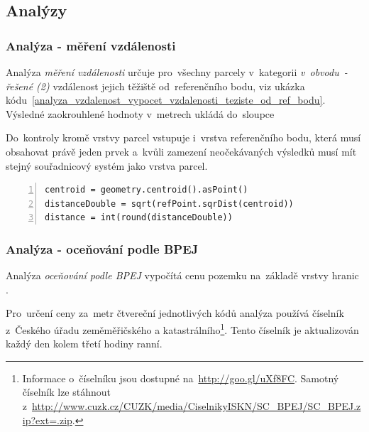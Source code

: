 \subsection{Analýzy}
\label{analyzy}

\subsubsection{Analýza - měření vzdálenosti}
\label{analyza_vzdalenosti}

Analýza \textit{měření vzdálenosti} určuje pro~všechny parcely
v~kategorii \textit{v~obvodu~- řešené (2)} vzdálenost jejich těžiště
od~referenčního bodu, viz ukázka
kódu~\ref{analyza_vzdalenost_vypocet_vzdalenosti_teziste_od_ref_bodu}. Výsledné
zaokrouhlené hodnoty v~metrech ukládá do~sloupce
\texttt{}

Do~kontroly kromě vrstvy parcel vstupuje i~vrstva referenčního bodu,
která musí obsahovat právě jeden prvek a~kvůli zamezení neočekávaných
výsledků musí mít stejný souřadnicový systém jako vrstva parcel.

{\scriptsize
\begin{lstlisting}[style=python, caption={Analýza \textit{měření
vzdálenosti}~– výpočet vzdálenosti těžiště\newline od~referenčního
bodu}, captionpos=b,
label=analyza_vzdalenost_vypocet_vzdalenosti_teziste_od_ref_bodu,
backgroundcolor = \color{light-gray}, numbers=left]
centroid = geometry.centroid().asPoint()
distanceDouble = sqrt(refPoint.sqrDist(centroid))
distance = int(round(distanceDouble))
\end{lstlisting}}

\subsubsection{Analýza - oceňování podle BPEJ}
\label{analyza_bpej}

Analýza \textit{oceňování podle BPEJ} vypočítá cenu pozemku na~základě
vrstvy hranic .

Pro~určení ceny za~metr čtvereční jednotlivých kódů  analýza
používá číselník  z~Českého úřadu zeměměřičského a
katastrálního\footnote{Informace o~číselníku jsou dostupné
na~\url{http://goo.gl/uXf8FC}. Samotný číselník lze stáhnout
z~\url{http://www.cuzk.cz/CUZK/media/CiselnikyISKN/SC_BPEJ/SC_BPEJ.zip?ext=.zip}.}. Tento
číselník je aktualizován každý den kolem třetí hodiny ranní.

